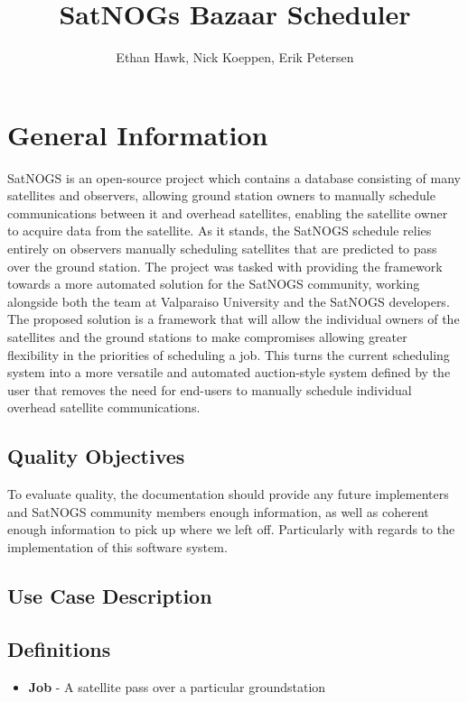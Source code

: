 \documentclass{article}
\author{Ethan Hawk, Nick Koeppen, Erik Petersen}
\title{SatNOGs Bazaar Scheduler}
\begin{document}
\maketitle
\tableofcontents

\section{General Information}

SatNOGS is an open-source project which contains a database consisting of many
satellites and observers, allowing ground station owners to manually schedule
communications between it and overhead satellites, enabling the satellite owner
to acquire data from the satellite. As it stands, the SatNOGS schedule relies
entirely on observers manually scheduling satellites that are predicted to pass
over the ground station. The project was tasked with providing the framework
towards a more automated solution for the SatNOGS community, working alongside
both the team at Valparaiso University and the SatNOGS developers. The proposed
solution is a framework that will allow the individual owners of the satellites
and the ground stations to make compromises allowing greater flexibility in the
priorities of scheduling a job. This turns the current scheduling system into a
more versatile and automated auction-style system defined by the user that
removes the need for end-users to manually schedule individual overhead
satellite communications.

\subsection{Quality Objectives}

To evaluate quality, the documentation should provide any future implementers
and SatNOGS community members enough information, as well as coherent enough
information to pick up where we left off. Particularly with regards to the
implementation of this software system.

\subsection{Use Case Description}

\subsection{Definitions}

\begin{itemize}
  \item \textbf{Job} - A satellite pass over a particular groundstation
\end{itemize}
\end{document}
